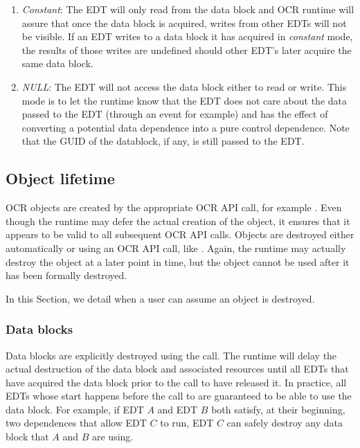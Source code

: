 \begin{enumerate}
\item \emph{Constant}: The EDT will only
  read from the data block and OCR runtime will assure that once the
  data block is acquired, writes from other EDTs will not be visible.
  If an EDT writes to a data block it has acquired in \emph{constant} mode,
  the results of those writes are undefined should other EDT's later
  acquire the same data block.
\item \emph{NULL}: The EDT will not access
  the data block either to read or write. This mode is to let the runtime
  know that the EDT does not care about the data passed to the EDT (through
  an event for example) and has the effect of converting a potential data dependence
  into a pure control dependence. Note that the GUID of the datablock, if any, is
  still passed to the EDT.
\end{enumerate}

\subsection{Object lifetime}
\label{sec:Lifetime}

OCR objects are created by the appropriate OCR API call, for example
. Even though the runtime may defer the actual
creation of the object, it ensures that it appears to be valid to all
subsequent OCR API calls. Objects are destroyed either automatically or
using an OCR API call, like . Again, the runtime
may actually destroy the object at a later point in time, but the object
cannot be used after it has been formally destroyed.

In this Section, we detail when a user can assume an object is destroyed.
\subsubsection{Data blocks}
Data blocks are explicitly destroyed using the  call. The
runtime will delay the actual destruction of the data block and associated
resources until all EDTs that have acquired the data block prior to the
call to  have released it. In practice, all EDTs whose
start happens before the call to  are guaranteed to be
able to use the data block. For example, if EDT $A$ and EDT $B$ both satisfy,
at their beginning, two dependences that allow EDT $C$ to run, EDT $C$ can
safely destroy any data block that $A$ and $B$ are using.
